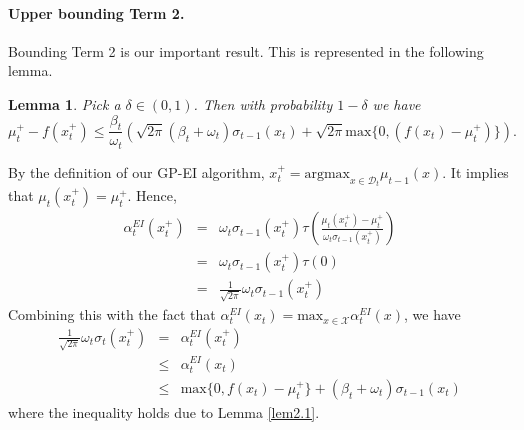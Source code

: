 \documentclass[twoside]{article}
\newtheorem{lemma}{Lemma}
\newenvironment{proof*}[1][\proofname]{
  \renewcommand\qedsymbol{\rule{2.5mm}{2.5mm}}
  \begin{proof}[#1]}{\end{proof}}
\begin{document}
\paragraph{Upper bounding Term 2.}
Bounding Term 2 is our important result. This is represented in the following lemma.
\begin{lemma}
Pick a $\delta \in (0, 1)$. Then with probability $1 - \delta$ we have $$\mu_{t}^+ - f(x^+_t) \le \frac{\beta_t}{\omega_t} (\sqrt{2\pi}(\beta_t + \omega_t)\sigma_{t-1}(x_{t}) + \sqrt{2\pi} \text{max}\{0,(f(x_{t}) - \mu_t^+) \}).$$
\label{lem2.3}
\end{lemma}
\begin{proof*}
By the definition of our GP-EI algorithm, $x^+_t =\text{argmax}_{x \in \mathcal D_t} \mu_{t-1}(x)$. It implies that $\mu_t(x^+_t) = \mu_{t}^+$. Hence,
\begin{eqnarray*}
\alpha_t^{EI}(x^+_t) & = & \omega_t \sigma_{t-1}(x^+_t) \tau(\frac{\mu_t(x^+_t) - \mu_{t}^+}{\omega_t\sigma_{t-1}(x^+_t)}) \\
& = & \omega_t \sigma_{t-1}(x^+_t) \tau(0) \\
& = & \frac{1}{\sqrt{2\pi}}\omega_t \sigma_{t-1}(x^+_t)
\end{eqnarray*}
Combining this with the fact that $\alpha_t^{EI}(x_{t}) = \text{max}_{x \in \mathcal X} \alpha_t^{EI}(x)$, we have
\begin{eqnarray*}
\frac{1}{\sqrt{2\pi}}\omega_t \sigma_t(x^+_t) & = & \alpha_t^{EI}(x^+_t) \\
& \le &  \alpha_t^{EI}(x_{t}) \\
& \le &   \text{max}\{0, f(x_{t}) - \mu_t^+\} + (\beta_t+ \omega_t)\sigma_{t-1}(x_{t})
\end{eqnarray*}
where the inequality holds due to Lemma \ref{lem2.1}.


\end{proof*}
\end{document}
